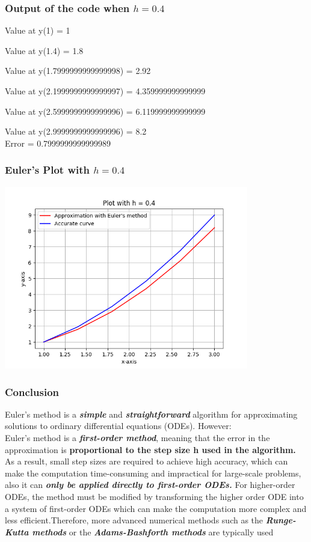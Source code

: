 \documentclass{beamer}
\begin{document}
\begin{frame}[fragile]
  \frametitle{Output of the code when $h = 0.4$}
Value at y(1) = 1

Value at y(1.4) = 1.8

Value at y(1.7999999999999998) = 2.92

Value at y(2.1999999999999997) = 4.359999999999999

Value at y(2.5999999999999996) = 6.119999999999999

Value at y(2.9999999999999996) = 8.2\\[10pt]
Error = 0.7999999999999989

\end{frame}

\begin{frame}
  \frametitle{Euler's Plot with $h = 0.4$}
  \begin{center}
    \includegraphics[width=0.8\textwidth]{Euler_04.png}
  \end{center}
\end{frame}

\begin{frame}
  \frametitle{Conclusion}
Euler's method is a \textbf{\textit{simple}} and \textbf{\textit{straightforward}} algorithm for approximating solutions to ordinary differential equations (ODEs). However:\\[11pt]
Euler's method is a \textbf{\textit{first-order method}}, meaning that the error in the approximation is \textbf{proportional to the step size h used in the algorithm.} As a result, small step sizes are required to achieve high accuracy, which can make the computation time-consuming and impractical for large-scale problems, also it can \textit{\textbf{only be applied directly to first-order ODEs.}} For higher-order ODEs, the method must be modified by transforming the higher order ODE into a system of first-order ODEs which can make the computation more complex and less efficient.Therefore, more advanced numerical methods such as the \textbf{\textit{Runge-Kutta methods}} or the \textbf{\textit{Adams-Bashforth methods}} are typically used

\end{frame}
\end{document}

